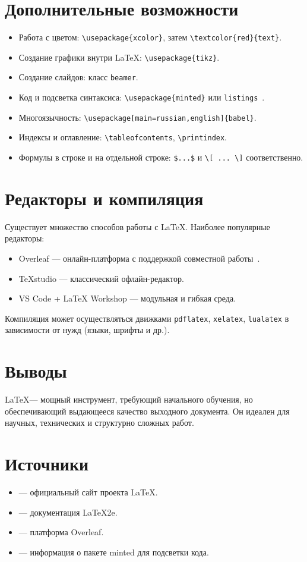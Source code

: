 \documentclass[a4paper,12pt]{report}
\begin{document}
\section{Дополнительные возможности}
\begin{itemize}[noitemsep]
    \item Работа с цветом: \verb|\usepackage{xcolor}|, затем \verb|\textcolor{red}{text}|.
    \item Создание графики внутри \LaTeX: \verb|\usepackage{tikz}|.
    \item Создание слайдов: класс \verb|beamer|.
    \item Код и подсветка синтаксиса: \verb|\usepackage{minted}| или \verb|listings|~\cite{latex_minted}.
    \item Многоязычность: \verb|\usepackage[main=russian,english]{babel}|.
    \item Индексы и оглавление: \verb|\tableofcontents|, \verb|\printindex|.
    \item Формулы в строке и на отдельной строке: \verb|$...$| и \verb|\[ ... \]| соответственно.
\end{itemize}

\section{Редакторы и компиляция}
Существует множество способов работы с \LaTeX. Наиболее популярные редакторы:
\begin{itemize}[noitemsep]
    \item Overleaf — онлайн-платформа с поддержкой совместной работы~\cite{overleaf_intro}.
    \item TeXstudio — классический офлайн-редактор.
    \item VS Code + LaTeX Workshop — модульная и гибкая среда.
\end{itemize}
Компиляция может осуществляться движками \verb|pdflatex|, \verb|xelatex|, \verb|lualatex| в зависимости от нужд (языки, шрифты и др.).

\section{Выводы}
\LaTeX — мощный инструмент, требующий начального обучения, но обеспечивающий выдающееся качество выходного документа. Он идеален для научных, технических и структурно сложных работ.

\section*{Источники}
\begin{itemize}[noitemsep]
    \item \cite{latex_project_site} — официальный сайт проекта LaTeX.
    \item \cite{latex_official_doc} — документация LaTeX2e.
    \item \cite{overleaf_intro} — платформа Overleaf.
    \item \cite{latex_minted} — информация о пакете minted для подсветки кода.
\end{itemize}
\end{document}
